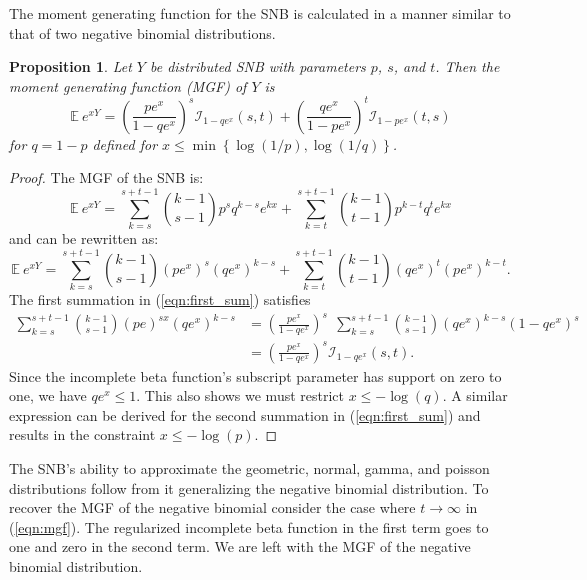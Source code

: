 \documentclass[review]{elsarticle}
\newtheorem{prop}{Proposition}
\begin{document}
The moment generating function for the SNB is calculated in a manner similar to 
that of two negative binomial distributions. 
\begin{prop} Let $Y$ be distributed SNB with parameters $p$, $s$, and $t$.
Then the moment generating function (MGF) of $Y$ is
\begin{equation} \label{eqn:mgf}
\mathbb{E}~e^{xY} = \left(\frac{p e^x}{1 - qe^x}\right)^s 
  \mathcal{I}_{1-qe^x} (s, t) + \left(\frac{qe^x}{1-pe^x}\right)^t 
  \mathcal{I}_{1-pe^x}(t, s)
\end{equation}
for $q = 1-p$ defined for $x \leq \min \left\{\log(1/p), \log(1/q) \right\}$.
\end{prop}
\begin{proof}
The MGF of the SNB is:
\begin{equation*}
\mathbb{E}~e^{xY} = \sum_{k=s}^{s+t-1} {k-1 \choose s-1} p^s q^{k-s} e^{kx} 
  + \sum_{k=t}^{s+t-1} {k-1 \choose t-1} p^{k-t} q^t e^{kx}
\end{equation*}
and can be rewritten as:
\begin{equation} \label{eqn:first_sum}
\mathbb{E}~e^{xY} = \sum_{k=s}^{s+t-1}{k-1 \choose s-1} (pe^x)^{s} (qe^x)^{k-s} 
  + \sum_{k=t}^{s+t-1}{k-1 \choose t-1} (qe^x)^t (pe^x)^{k-t}.
\end{equation}
The first summation in (\ref{eqn:first_sum}) satisfies
\begin{align*}
\sum_{k=s}^{s+t-1}{k-1 \choose s-1} (pe)^{sx} (qe^x)^{k-s} &= 
  \left(\frac{pe^x}{1 - qe^x}\right)^s \ \ \sum_{k=s}^{s+t-1} {k-1 \choose s-1} 
    (qe^x)^{k-s} (1-qe^x)^s \\
  &= \left(\frac{pe^x}{1 - qe^x}\right)^s \mathcal{I}_{1-qe^x}(s, t).
\end{align*}
Since the incomplete beta function's subscript parameter has support on zero 
to one, we have $qe^x \leq 1$. This also shows we must restrict
$x \leq -\log(q)$.
A similar expression can be derived for the second summation in 
(\ref{eqn:first_sum}) and results in
the constraint $x \leq -\log(p)$.
\end{proof}

The SNB's ability to approximate the geometric, normal, gamma, and poisson
distributions follow from it generalizing the negative binomial distribution. 
To recover the MGF of the negative binomial consider the case where
$t \rightarrow \infty$ in (\ref{eqn:mgf}). The regularized incomplete
beta function in the first term goes to one and zero in the second term.
We are left with the MGF of the negative binomial distribution. 
\end{document}
